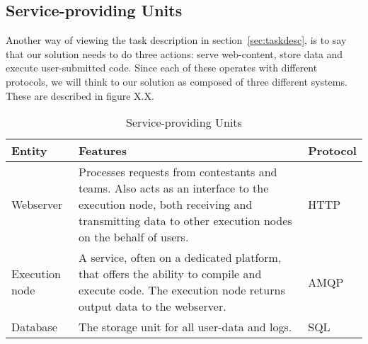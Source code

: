 \subsection{Service-providing Units}

Another way of viewing the task description in section~\ref{sec:taskdesc}, is to say
that our solution needs to do three actions: serve web-content, store
data and execute user-submitted code. Since each of these operates with
different protocols, we will think to our solution as composed of three
different systems. These are described in figure X.X. 

\begin{table}
\caption{Service-providing Units}
\label{table:serviceUnits}
\tablehead{}
\begin{supertabular}{|m{0.2\textwidth}|m{0.6\textwidth}|m{0.2\textwidth}|}
\hline
Entity &
Features &
Protocol\\\hline
Webserver &
Processes requests from contestants and teams. Also acts as an
interface to the execution node, both receiving and transmitting data
to other execution nodes on the behalf of users. &
HTTP\\\hline
Execution node &
A service, often on a dedicated platform, that offers the ability to
compile and execute code. The execution node returns output data to the
webserver. &
AMQP\\\hline
Database &
The storage unit for all user{}-data and logs. &
SQL\\\hline
\end{supertabular}
\end{table}



